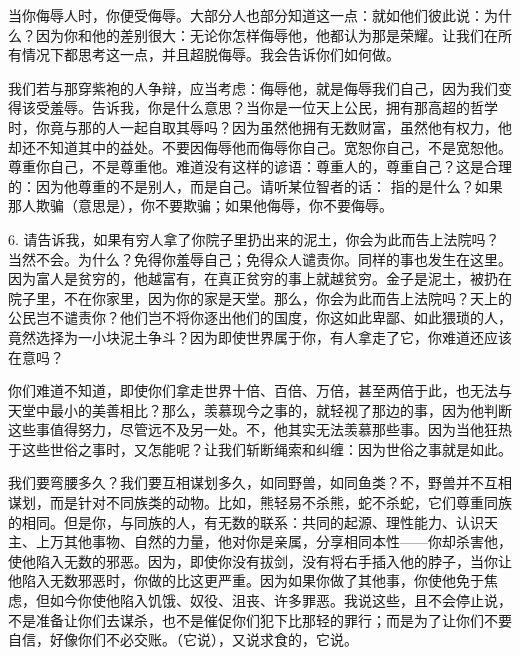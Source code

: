 当你侮辱人时，你便受侮辱。大部分人也部分知道这一点：就如他们彼此说：为什么？因为你和他的差别很大：无论你怎样侮辱他，他都认为那是荣耀。让我们在所有情况下都思考这一点，并且超脱侮辱。我会告诉你们如何做。\par

我们若与那穿紫袍的人争辩，应当考虑：侮辱他，就是侮辱我们自己，因为我们变得该受羞辱。告诉我，你是什么意思？当你是一位天上公民，拥有那高超的哲学时，你竟与那的人一起自取其辱吗？因为虽然他拥有无数财富，虽然他有权力，他却还不知道其中的益处。不要因侮辱他而侮辱你自己。宽恕你自己，不是宽恕他。尊重你自己，不是尊重他。难道没有这样的谚语：尊重人的，尊重自己？这是合理的：因为他尊重的不是别人，而是自己。请听某位智者的话： 指的是什么？如果那人欺骗（意思是），你不要欺骗；如果他侮辱，你不要侮辱。\par

6. 请告诉我，如果有穷人拿了你院子里扔出来的泥土，你会为此而告上法院吗？当然不会。为什么？免得你羞辱自己；免得众人谴责你。同样的事也发生在这里。因为富人是贫穷的，他越富有，在真正贫穷的事上就越贫穷。金子是泥土，被扔在院子里，不在你家里，因为你的家是天堂。那么，你会为此而告上法院吗？天上的公民岂不谴责你？他们岂不将你逐出他们的国度，你这如此卑鄙、如此猥琐的人，竟然选择为一小块泥土争斗？因为即使世界属于你，有人拿走了它，你难道还应该在意吗？\par

你们难道不知道，即使你们拿走世界十倍、百倍、万倍，甚至两倍于此，也无法与天堂中最小的美善相比？那么，羡慕现今之事的，就轻视了那边的事，因为他判断这些事值得努力，尽管远不及另一处。不，他其实无法羡慕那些事。因为当他狂热于这些世俗之事时，又怎能呢？让我们斩断绳索和纠缠：因为世俗之事就是如此。\par

我们要弯腰多久？我们要互相谋划多久，如同野兽，如同鱼类？不，野兽并不互相谋划，而是针对不同族类的动物。比如，熊轻易不杀熊，蛇不杀蛇，它们尊重同族的相同。但是你，与同族的人，有无数的联系：共同的起源、理性能力、认识天主、上万其他事物、自然的力量，他对你是亲属，分享相同本性——你却杀害他，使他陷入无数的邪恶。因为，即使你没有拔剑，没有将右手插入他的脖子，当你让他陷入无数邪恶时，你做的比这更严重。因为如果你做了其他事，你使他免于焦虑，但如今你使他陷入饥饿、奴役、沮丧、许多罪恶。我说这些，且不会停止说，不是准备让你们去谋杀，也不是催促你们犯下比那轻的罪行；而是为了让你们不要自信，好像你们不必交账。（它说），又说求食的，它说。\par

